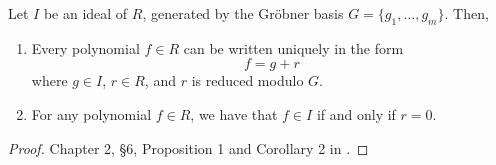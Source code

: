 \begin{comment}
\begin{theorem}
  \label{thm_groebner_basis_product}
  Let $I$ and $J$ be ideals of $R = K[x_1, \ldots, x_n]$, generated by Gr\"obner bases, say
  \begin{align*}
    I &= \pid{f_1, \ldots, f_m} \\
    J &= \pid{g_1, \ldots, g_n}.
  \end{align*}
  Then
  \[ \{ f_ig_j ~|~ 1 \leq i \leq m, 1 \leq j \leq n \} \]
  is a Gr\"obner basis for the ideal product $IJ$.
\end{theorem}
\begin{proof}
  \begin{align*}
    \LT(IJ)
      &= \pid{ \LT(h) ~|~ h \in IJ } \\
      &= \pid{ \LT(fg) ~|~ f \in I, g \in J } \\
      &= \pid{ \LT(f)\LT(g) ~|~ f \in I, g \in J } \\
      &= \pid{ \LT(f) ~|~ f \in I } \pid{ \LT(g) ~|~ g \in J } \\
      &= \LT(I) \LT(J) \\
      &= \pid{ \LT(f_i) ~|~ 1 \leq i \leq m } \pid{ \LT(g_j) ~|~ 1 \leq j \leq n } \\
      &= \pid{ \LT(f_i) \LT(g_j) ~|~ 1 \leq i \leq m, 1 \leq j \leq n } \\
      &= \pid{ \LT(f_i g_j) ~|~ 1 \leq i \leq m, 1 \leq j \leq n }
  \end{align*}
\end{proof}
\end{comment}

\begin{theorem}
  \label{thm_groebner_basis_remainder}
  Let $I$ be an ideal of $R$, generated by the Gr\"obner basis $G = \{ g_1, \ldots, g_m \}$. Then,
  \begin{enumerate}[label=(\roman*)]
    \item
    Every polynomial $f \in R$ can be written uniquely in the form
    \begin{equation*}
      f = g + r
    \end{equation*}
    where $g \in I$, $r \in R$, and $r$ is reduced modulo $G$.

    \item
    For any polynomial $f \in R$, we have that $f \in I$ if and only if $r = 0$.
  \end{enumerate}
\end{theorem}
\begin{proof}
  Chapter 2, \S 6, Proposition 1 and Corollary 2 in \cite{cox07}.
\end{proof}

